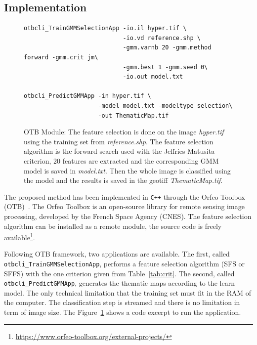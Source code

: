 \documentclass[journal,peerreview,onecolumn]{IEEEtran}
\begin{document}
    \subsection{Implementation}
    \label{sec:otb-module}
    \begin{figure} 
        \centering %
        \begin{verbatim} 
otbcli_TrainGMMSelectionApp -io.il hyper.tif \
                            -io.vd reference.shp \
                            -gmm.varnb 20 -gmm.method forward -gmm.crit jm\
                            -gmm.best 1 -gmm.seed 0\
                            -io.out model.txt

otbcli_PredictGMMApp -in hyper.tif \
                     -model model.txt -modeltype selection\
                     -out ThematicMap.tif
        \end{verbatim}
        \caption{OTB Module: The feature selection is done on the image \emph{hyper.tif} using the training set from \emph{reference.shp}. The feature selection algorithm is the forward search used with the Jeffries-Matusita criterion, 20 features are extracted and the corresponding GMM model is saved in \emph{model.txt}. Then the whole image is classified using the model and the results is saved in the geotiff \emph{ThematicMap.tif}.}
        \label{fig:otb:ffs}
    \end{figure}

    
    The proposed  method has been implemented  in \texttt{C++} through
    the  Orfeo  Toolbox (OTB)~\cite{christophe2008orfeo}.   The  Orfeo
    Toolbox  is  an  open-source  library  for  remote  sensing  image
    processing,  developed by  the  French Space  Agency (CNES).   The
    feature selection algorithm  can be installed as  a remote module,
    the           source            code           is           freely
    available\footnote{\url{https://www.orfeo-toolbox.org/external-projects/}}.

    Following  OTB framework,  two  applications  are available.   The
    first,  called  \texttt{otbcli\_TrainGMMSelectionApp}, performs  a
    feature selection algorithm  (SFS or SFFS) with  the one criterion
    given      from Table~\ref{tab:crit}.       The      second,      called
    \texttt{otbcli\_PredictGMMApp},   generates   the  thematic   maps
    according to the  learn model. The only  technical limitation that
    the  training set  must  fit  in the  RAM  of  the computer.   The
    classification step is streamed and there is no limitation in term
    of image  size. The Figure~\ref{fig:otb:ffs} shows  a code excerpt
    to run the application.
\end{document}
